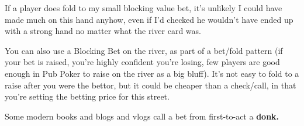 If a player does fold to my small blocking value bet, it's unlikely
I could have made much on this hand anyhow, even if I'd checked
he wouldn't have ended up with a strong hand no matter what
the river card was.

You can also use a Blocking Bet on the river, as part of a
bet/fold pattern (if your bet is raised, you're highly
confident you're losing, few players are good enough in
Pub Poker to raise on the river as a big bluff). It's not
easy to fold to a raise after you were the bettor, but it could
be cheaper than a check/call, in that you're setting the betting
price for this street.

Some modern books and blogs and vlogs call a bet from
first-to-act a \textbf{donk.}


